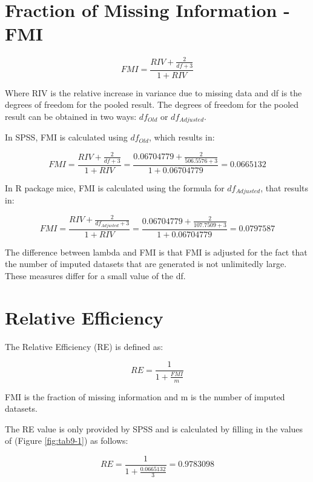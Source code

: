 \documentclass[
]{book}
\begin{document}
\hypertarget{fraction-of-missing-information---fmi}{%
\section{Fraction of Missing Information - FMI}\label{fraction-of-missing-information---fmi}}

\begin{equation}
FMI = \frac{RIV + \frac{2}{df+3}}{1+RIV}
  \label{eq:fmi}
\end{equation}

Where RIV is the relative increase in variance due to missing data and df is the degrees of freedom for the pooled result. The degrees of freedom for the pooled result can be obtained in two ways: \({df_{Old}}\) or \({df_{Adjusted}}\).

In SPSS, FMI is calculated using \({df_{Old}}\), which results in:

\[FMI = \frac{RIV + \frac{2}{df+3}}{1+RIV}=\frac{0.06704779 + \frac{2}{506.5576+3}}{1+0.06704779}=0.0665132\]

In R package mice, FMI is calculated using the formula for \({df_{Adjusted}}\), that results in:

\[FMI = \frac{RIV + \frac{2}{df_{Adjusted}+3}}{1+RIV}=\frac{0.06704779 + \frac{2}{107.7509+3}}{1+0.06704779}=0.0797587\]

The difference between lambda and FMI is that FMI is adjusted for the fact that the number of imputed datasets that are generated is not unlimitedly large. These measures differ for a small value of the df.

\hypertarget{relative-efficiency}{%
\section{Relative Efficiency}\label{relative-efficiency}}

The Relative Efficiency (RE) is defined as:

\begin{equation}
RE = \frac{1}{1+\frac{FMI}{m}}
  \label{eq:re}
\end{equation}

FMI is the fraction of missing information and m is the number of imputed datasets.

The RE value is only provided by SPSS and is calculated by filling in the values of (Figure \ref{fig:tab9-1}) as follows:

\[RE = \frac{1}{1+\frac{0.0665132}{3}}=0.9783098\]
\end{document}

